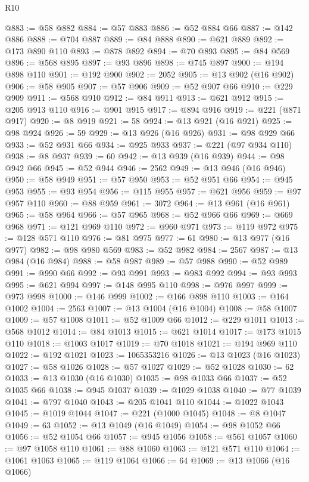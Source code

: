 \begin{lexlean}{R10}
\begin{coremodule}
@883 := @58 @882
@884 := @57 @883
@886 := @52 @884 @66
@887 := @142 @886
@888 := @704 @887
@889 := @84 @888
@890 := @621 @889
@892 := @173 @890 @110
@893 := @878 @892
@894 := @70 @893
@895 := @84 @569
@896 := @568 @895
@897 := @93 @896
@898 := @745 @897
@900 := @194 @898 @110
@901 := @192 @900
@902 := 2052
@905 := @13 @902 (@16 @902)
@906 := @58 @905
@907 := @57 @906
@909 := @52 @907 @66
@910 := @229 @909
@911 := @568 @910
@912 := @84 @911
@913 := @621 @912
@915 := @205 @913 @110
@916 := @901 @915
@917 := @894 @916
@919 := @221 (@871 @917)
@920 := @8 @919
@921 := 58
@924 := @13 @921 (@16 @921)
@925 := @98 @924
@926 := 59
@929 := @13 @926 (@16 @926)
@931 := @98 @929 @66
@933 := @52 @931 @66
@934 := @925 @933
@937 := @221 (@97 @934 @110)
@938 := @8 @937
@939 := 60
@942 := @13 @939 (@16 @939)
@944 := @98 @942 @66
@945 := @52 @944
@946 := 2562
@949 := @13 @946 (@16 @946)
@950 := @58 @949
@951 := @57 @950
@953 := @52 @951 @66
@954 := @945 @953
@955 := @93 @954
@956 := @115 @955
@957 := @621 @956
@959 := @97 @957 @110
@960 := @88 @959
@961 := 3072
@964 := @13 @961 (@16 @961)
@965 := @58 @964
@966 := @57 @965
@968 := @52 @966 @66
@969 := @669 @968
@971 := @121 @969 @110
@972 := @960 @971
@973 := @119 @972
@975 := @128 @571 @110
@976 := @81 @975
@977 := 61
@980 := @13 @977 (@16 @977)
@982 := @98 @980 @569
@983 := @52 @982
@984 := 2567
@987 := @13 @984 (@16 @984)
@988 := @58 @987
@989 := @57 @988
@990 := @52 @989
@991 := @990 @66
@992 := @93 @991
@993 := @983 @992
@994 := @93 @993
@995 := @621 @994
@997 := @148 @995 @110
@998 := @976 @997
@999 := @973 @998
@1000 := @146 @999
@1002 := @166 @898 @110
@1003 := @164 @1002
@1004 := 2563
@1007 := @13 @1004 (@16 @1004)
@1008 := @58 @1007
@1009 := @57 @1008
@1011 := @52 @1009 @66
@1012 := @229 @1011
@1013 := @568 @1012
@1014 := @84 @1013
@1015 := @621 @1014
@1017 := @173 @1015 @110
@1018 := @1003 @1017
@1019 := @70 @1018
@1021 := @194 @969 @110
@1022 := @192 @1021
@1023 := 1065353216
@1026 := @13 @1023 (@16 @1023)
@1027 := @58 @1026
@1028 := @57 @1027
@1029 := @52 @1028
@1030 := 62
@1033 := @13 @1030 (@16 @1030)
@1035 := @98 @1033 @66
@1037 := @52 @1035 @66
@1038 := @945 @1037
@1039 := @1029 @1038
@1040 := @77 @1039
@1041 := @797 @1040
@1043 := @205 @1041 @110
@1044 := @1022 @1043
@1045 := @1019 @1044
@1047 := @221 (@1000 @1045)
@1048 := @8 @1047
@1049 := 63
@1052 := @13 @1049 (@16 @1049)
@1054 := @98 @1052 @66
@1056 := @52 @1054 @66
@1057 := @945 @1056
@1058 := @561 @1057
@1060 := @97 @1058 @110
@1061 := @88 @1060
@1063 := @121 @571 @110
@1064 := @1061 @1063
@1065 := @119 @1064
@1066 := 64
@1069 := @13 @1066 (@16 @1066)

\end{coremodule}
\end{lexlean}
